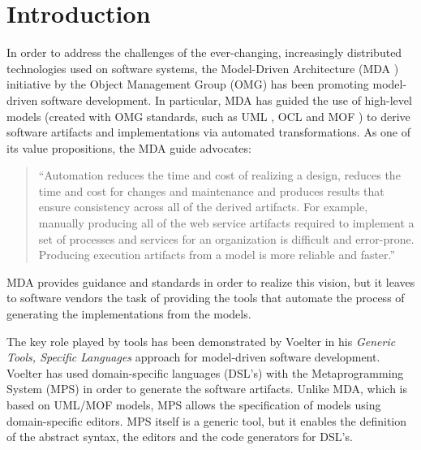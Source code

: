 \section{Introduction}
%
In order to address the challenges of the ever-changing, increasingly distributed technologies used on software systems, the Model-Driven Architecture (MDA \cite{mda}) initiative by the Object Management Group (OMG) has been promoting model-driven software development.
In particular, MDA has guided the use of high-level models (created with OMG standards, such as UML \cite{uml}, OCL \cite{ocl} and MOF \cite{mof}) to derive software artifacts and implementations via automated transformations.
As one of its value propositions, the MDA guide \cite{mda} advocates:
\begin{quote}``Automation reduces the time and cost of realizing a design, reduces the time and cost for changes and maintenance and produces results that ensure consistency across all of the derived artifacts. For example, manually producing all of the web service artifacts required to implement a set of processes and services for an organization is difficult and error-prone. Producing execution artifacts from a model is more reliable and faster.''\end{quote} 

MDA provides guidance and standards in order to realize this vision, but it leaves to software vendors the task of providing the tools that automate the process of generating the implementations from the models.

The key role played by tools has been demonstrated by Voelter \cite{voelter} in his \emph{Generic Tools, Specific Languages} approach for model-driven software development. Voelter \cite{voelter} has used domain-specific languages (DSL's) with the Metaprogramming System (MPS) in order to generate the software artifacts.
Unlike MDA, which is based on UML/MOF models, MPS allows the specification of models using domain-specific editors.
MPS itself is a generic tool, but it enables the definition of the abstract syntax, the editors and the code generators for DSL's.


